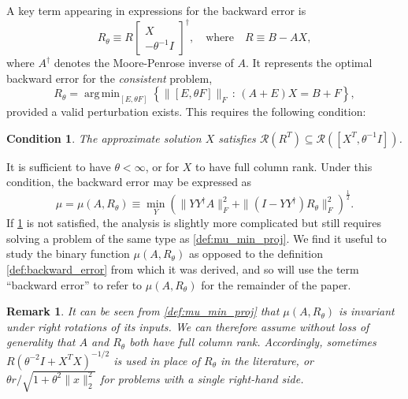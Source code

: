 \documentclass{article}
\newcommand{\tr}{\operatorname{tr}}
\newcommand{\ts}{^T}
\DeclareMathOperator*{\argmin}{arg\,\min}
\newtheorem{assumption}{Condition}
\newtheorem{remark}{Remark}
\begin{document}
A key term appearing in expressions for the backward error is 
\begin{equation*}
    R_\theta \equiv R\begin{bmatrix}
        X \\ -\theta^{-1}I
    \end{bmatrix}^\dagger,\quad \text{where}\quad R\equiv B-AX,
\end{equation*}
where $A^\dagger$ denotes the Moore-Penrose inverse of $A$. It represents the optimal backward error for the {\em consistent} problem, 
\begin{equation*}
    R_\theta = \argmin_{[E,\theta F]} \left\{\|[E, \theta F]\|_F\,:\, (A+E)X = B+F\right\},
\end{equation*}
provided a valid perturbation exists. This requires the following condition:
\begin{assumption}\label{assumption:rank}
    The approximate solution $X$ satisfies
    $\mathcal{R}(R\ts)\subseteq \mathcal{R}([X\ts , \theta^{-1} I])$.
\end{assumption}
It is sufficient to have $\theta < \infty$, or for $X$ to have full column rank. Under this condition, the backward error may be expressed as 
\begin{equation}\label{def:mu_min_proj}
    \mu = \mu(A,R_\theta) \equiv \min_{Y} \left(\|YY^\dagger A\|_F^2 + \|(I-YY^\dagger)R_\theta\|_F^2\right)^{\frac{1}{2}}. 
\end{equation}
If \cref{assumption:rank} is not satisfied, the analysis is slightly more complicated \cite[Thm.~5.1]{sun1996optimal} but still requires solving a problem of the same type as \cref{def:mu_min_proj}. We find it useful to study the binary function $\mu(A,R_\theta)$ as opposed to the definition \cref{def:backward_error} from which it was derived, and so will use the term ``backward error'' to refer to $\mu(A,R_\theta)$ for the remainder of the paper.

\begin{remark}\label{remark:mu_rotation_invariant}
    It can be seen from \cref{def:mu_min_proj} that $\mu(A,R_\theta)$ is invariant under right rotations of its inputs. We can therefore assume without loss of generality that $A$ and $R_\theta$ both have full column rank. Accordingly, sometimes $R(\theta^{-2}I+X\ts X)^{-1/2}$ is used in place of $R_\theta$ in the literature, or $\theta r/\sqrt{1 + \theta^2\|x\|_2^2}$ for problems with a single right-hand side. 
\end{remark}

\end{document}
